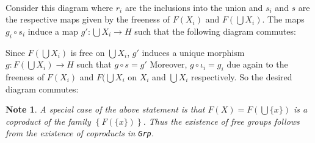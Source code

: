 \documentclass[twoside]{report}
\newcommand{\cat}[1]{\texttt{#1}}
\newcounter{Lecture}
\theoremstyle{myts}
\newcounter{c}[Lecture]
\newtheorem*{nte}{Note}
\newcounter{ex}
\newenvironment{prf}{
  \noindent\begin{mdframed}[style=prf]}{\end{mdframed} \vspace{1em}
}
\begin{document}
\begin{prf}
  \begin{center}
    \
  \end{center}
  Consider this diagram where $r_i$ are the inclusions into the union and $s_i$ and $s$ are the respective maps given by the freeness of \(F(X_i)\) and \(F(\bigcup X_i)\). The maps \(g_i\circ s_i\) induce a map \(g': \bigcup X_i \to H \) such that the following diagram commutes:
  \begin{center}
  \end{center}
  Since \(F(\bigcup X_i)\) is free on \(\bigcup X_i\), $g'$ induces a unique morphism \(g: F(\bigcup X_i) \to H\) such that \(g\circ s = g'\) Moreover, \(g\circ \iota_i = g_i\) due again to the freeness of \(F(X_i)\) and \(F(\bigcup X_i\) on \(X_i\) and \(\bigcup X_i\) respectively. So the desired diagram commutes:
  \begin{center}
  \end{center}
\end{prf}

\begin{nte}
  A special case of the above statement is that \(F(X)=F\left(\bigcup \{x\}\right)\) is a coproduct of the family \( \left\{ F(\{x\})\right\}\). Thus the existence of free groups follows from the existence of coproducts in \cat{Grp}.
\end{nte}
\end{document}
